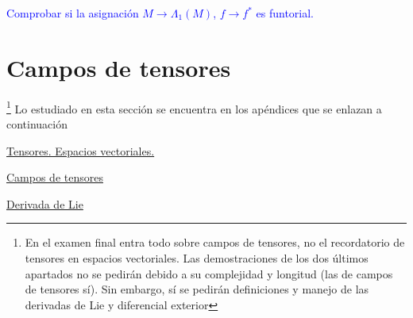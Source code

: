 \begin{obs}
\textcolor{blue}{Comprobar si la asignación $M \to \Lambda_1(M)$, $f \to f^*$ es funtorial.}
\end{obs}

\section{Campos de tensores} \footnote{En el examen final entra todo sobre campos de tensores, no el recordatorio de tensores en espacios vectoriales. Las demostraciones de los dos \'ultimos apartados no se pedir\'an debido a su complejidad y longitud (las de campos de tensores s\'i). Sin embargo, s\'i se pedir\'an definiciones y manejo de las derivadas de Lie y diferencial exterior}
Lo estudiado en esta secci\'on se encuentra en los ap\'endices que se enlazan a continuaci\'on

\hyperref[ap1]{Tensores. Espacios vectoriales.}

\hyperref[ap2]{Campos de tensores}

\hyperref[ap3]{Derivada de Lie}

